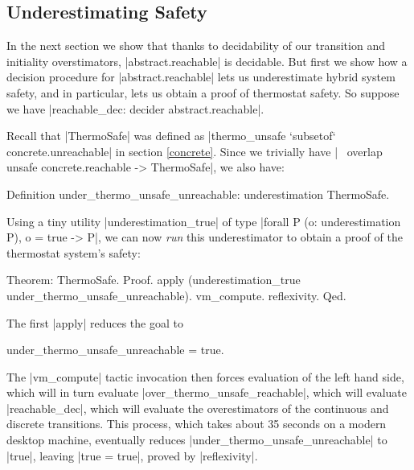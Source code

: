 \documentclass[runningheads]{llncs}
\newcommand{\weg}[1]{}
\begin{document}
\subsection{Underestimating Safety}
\label{underestimatingsafety}


In the next section we show that thanks to decidability of our
transition and initiality overstimators, |abstract.reachable| is
decidable. But first we show how a
decision procedure for |abstract.reachable| lets us underestimate
hybrid system safety, and in particular, lets us obtain a proof of
thermostat safety. So suppose we have |reachable_dec: decider abstract.reachable|.
\weg{
And suppose we are given the following specification of unsafe concrete states, covered by a finite list of abstract states:
\begin{code}
  Variables
    (unsafe: concrete.State -> Prop)
    (astates: list abstract.State)
    (astates_cover_unsafe: forall s, unsafe s -> forall r, s `elem` r -> r `elem` astates).
\end{code}

Then, using |reachable_dec| and |unreachable_respect|, we can easily define
\begin{code}
  Definition over_unsafe_reachable: overestimation (overlap unsafe concrete.reachable).
\end{code}
Taking |unsafe := thermo_unsafe| and a suitable abstract cover, we obtain
\begin{code}
  Definition over_thermo_unsafe_reachable:
    overestimation (overlap thermo_unsafe concrete.reachable).
\end{code}
}
Recall that |ThermoSafe| was defined as |thermo_unsafe `subsetof` concrete.unreachable| in section \ref{concrete}. Since we trivially have |~ overlap unsafe concrete.reachable -> ThermoSafe|, we also have:
\begin{code}
Definition under_thermo_unsafe_unreachable: underestimation ThermoSafe.
\end{code}
Using a tiny utility |underestimation_true| of type |forall P (o: underestimation P), o = true -> P|, we can now \emph{run} this underestimator to obtain a proof of the thermostat system's safety:
\begin{code}
Theorem: ThermoSafe.
Proof.
  apply (underestimation_true under_thermo_unsafe_unreachable).
  vm_compute.  reflexivity.
Qed.
\end{code}
The first |apply| reduces the goal to
\begin{code}under_thermo_unsafe_unreachable = true.\end{code} The |vm_compute| tactic invocation then forces evaluation of the left hand side, which will in turn evaluate |over_thermo_unsafe_reachable|, which will evaluate |reachable_dec|, which will evaluate the overestimators of the continuous and discrete transitions. This process, which takes about 35 seconds on a modern desktop machine, eventually reduces |under_thermo_unsafe_unreachable| to |true|, leaving |true = true|, proved by |reflexivity|.
\end{document}
